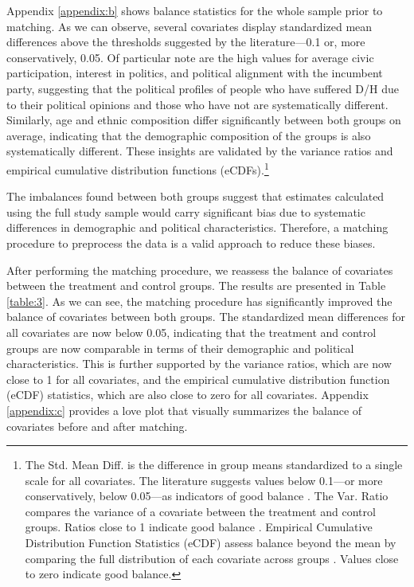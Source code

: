 \documentclass{article}
\begin{document}
Appendix \ref{appendix:b} shows balance statistics for the whole sample prior to matching. As we can observe, several covariates display standardized mean differences above the thresholds suggested by the literature—0.1 or, more conservatively, 0.05. Of particular note are the high values for average civic participation, interest in politics, and political alignment with the incumbent party, suggesting that the political profiles of people who have suffered D/H due to their political opinions and those who have not are systematically different. Similarly, age and ethnic composition differ significantly between both groups on average, indicating that the demographic composition of the groups is also systematically different. These insights are validated by the variance ratios and empirical cumulative distribution functions (eCDFs).\footnote{The Std. Mean Diff. is the difference in group means standardized to a single scale for all covariates. The literature suggests values below 0.1—or more conservatively, below 0.05—as indicators of good balance \parencite{ali_propensity_2014, stuart_prognostic_2013}. The Var. Ratio compares the variance of a covariate between the treatment and control groups. Ratios close to 1 indicate good balance \parencite{austin_balance_2009}. Empirical Cumulative Distribution Function Statistics (eCDF) assess balance beyond the mean by comparing the full distribution of each covariate across groups \parencite{mccaffrey_propensity_2004}. Values close to zero indicate good balance.}

The imbalances found between both groups suggest that estimates calculated using the full study sample would carry significant bias due to systematic differences in demographic and political characteristics. Therefore, a matching procedure to preprocess the data is a valid approach to reduce these biases.

After performing the matching procedure, we reassess the balance of covariates between the treatment and control groups. The results are presented in Table \ref{table:3}. As we can see, the matching procedure has significantly improved the balance of covariates between both groups. The standardized mean differences for all covariates are now below 0.05, indicating that the treatment and control groups are now comparable in terms of their demographic and political characteristics. This is further supported by the variance ratios, which are now close to 1 for all covariates, and the empirical cumulative distribution function (eCDF) statistics, which are also close to zero for all covariates. Appendix \ref{appendix:c} provides a love plot that visually summarizes the balance of covariates before and after matching.
\end{document}
